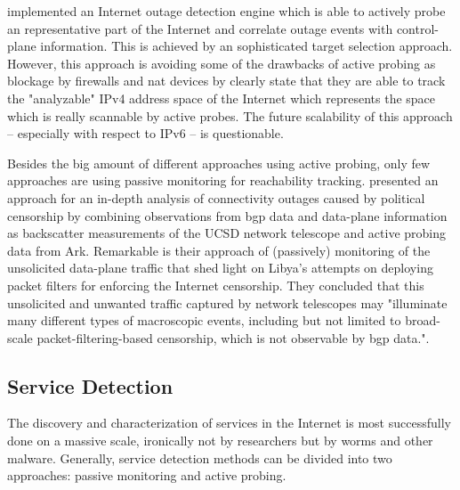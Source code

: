 \citet{Quan12a} implemented an Internet outage detection engine which is able to
actively probe an representative part of the Internet and correlate outage
events with \gls{control-plane} information. This is achieved by an 
sophisticated target selection approach. 
However, this approach is avoiding some of the drawbacks of active probing as 
blockage by firewalls and \gls{nat} devices by clearly state that they are able 
to track the "analyzable" \gls{IPv4} address space of the Internet which 
represents the space which is really scannable by active probes. 
The future scalability of this approach -- especially with respect to \gls{IPv6} 
-- is questionable. 

Besides the big amount of different approaches using active probing, only few
approaches are using passive monitoring for reachability tracking.
\citet{Dainotti:2011:ACI} presented an approach for an in-depth analysis of
connectivity outages caused by political censorship by combining observations
from \gls{bgp} data and \gls{data-plane} information as backscatter measurements 
of the UCSD network telescope and active probing data from Ark. Remarkable is 
their approach of (passively) monitoring of the unsolicited \gls{data-plane} 
traffic that shed light on Libya's attempts on deploying packet filters for 
enforcing the Internet censorship. 
They concluded that this unsolicited and unwanted traffic 
captured by network telescopes may "illuminate many different types of 
macroscopic events, including but not limited to broad-scale 
packet-filtering-based censorship, which is not observable by \gls{bgp} 
data."\citep{Dainotti:2011:ACI}.

\subsection{Service Detection} 

The discovery and characterization of services in the Internet is most
successfully done on a massive scale, ironically not by researchers but by worms
and other malware\citep{Chen:2007}. Generally, service detection methods can be
divided into two approaches: passive monitoring and active probing. 

